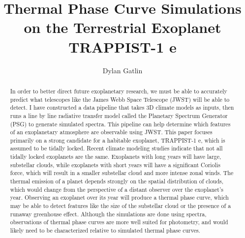 \documentclass[preprint2]{aastex63}
\begin{document}
\title{Thermal Phase Curve Simulations on the Terrestrial Exoplanet
 TRAPPIST-1 e}

\author{Dylan Gatlin}

\begin{abstract}
In order to better direct future exoplanetary research, we must be
 able to accurately predict what telescopes like the James Webb Space Telescope
 (JWST) will be able to detect. I have constructed a data pipeline that takes
 3D climate models as inputs, then runs a line by line radiative transfer model
 called the Planetary Spectrum Generator (PSG) to generate simulated spectra.
 This pipeline can help determine which features of an exoplanetary atmosphere
 are observable using JWST. This paper focuses primarily on a strong candidate
 for a habitable exoplanet, TRAPPIST-1 e, which is assumed to be tidally locked.
 Recent climate modeling studies indicate that not all tidally locked exoplanets
 are the same. Exoplanets with long years will have large, substellar clouds,
 while exoplanets with short years will have a significant Coriolis force,
 which will result in a smaller substellar cloud and more intense zonal winds.
 The thermal emission of a planet depends strongly on the spatial
 distribution of clouds, which would change from the perspective of a distant
 observer over the exoplanet's year. Observing an exoplanet over its year will
 produce a thermal phase curve, which may be able to detect features like the
 size of the substellar cloud or the presence of a runaway greenhouse effect.
 Although the simulations are done using spectra, observations of
 thermal phase curves are more well suited for photometry, and would likely need
 to be characterized relative to simulated thermal phase curves.

\end{abstract}
 



% 
% 
% 


% 
\end{document}
